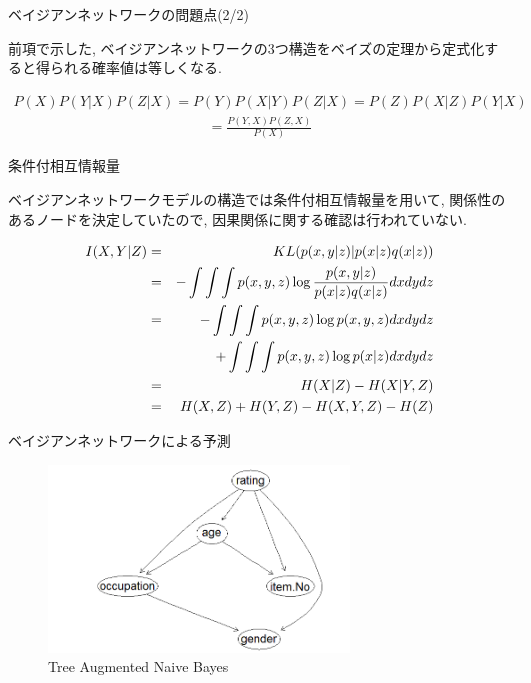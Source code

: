 \documentclass[dvipdfmx]{beamer}
\begin{document}
\begin{frame}{ベイジアンネットワークの問題点(2/2)}

前項で示した, ベイジアンネットワークの3つ構造をベイズの定理から定式化すると得られる確率値は等しくなる. 

\begin{eqnarray}
P(X) P(Y|X) P(Z|X) = P(Y) P(X|Y) P(Z|X) = P(Z) P(X|Z) P(Y|X) \nonumber 
\end{eqnarray} 
\vspace{-1.5zh}
\begin{eqnarray}
= \frac{P(Y, X) P(Z, X)}{P(X)} \nonumber
\end{eqnarray} 


\end{frame}

\begin{frame}{条件付相互情報量}

ベイジアンネットワークモデルの構造では条件付相互情報量を用いて, 関係性のあるノードを決定していたので, 因果関係に関する確認は行われていない. 

\begin{eqnarray}
\label{CMI}
I(X, Y | Z)  &=&  KL(p(x, y| z) | p(x|z) q(x|z)) \nonumber \\
               &=& - \int \int \int p(x, y, z) \log \frac{p(x, y|z)}{p(x|z) q(x|z)} dx dy dz \nonumber \\
               &=& - \int \int \int p(x, y, z) \log p(x, y, z) dx dy dz  \nonumber \\
               & & \hspace{0.5cm} + \int \int \int p(x, y, z) \log p(x| z) dx dy dz  \nonumber \\
               &=& H(X| Z) - H(X| Y, Z) \nonumber \\
               &=& H(X, Z) + H(Y, Z) - H(X, Y, Z) - H(Z)
\end{eqnarray}
\end{frame}

\begin{frame}{ベイジアンネットワークによる予測}



\begin{figure}[H]
\begin{center}
\includegraphics[width=80mm]{data/sample2.png}
\caption{Tree Augmented Naive Bayes}
\label{TAN}
\end{center}
\end{figure}

\end{frame}
\end{document}
